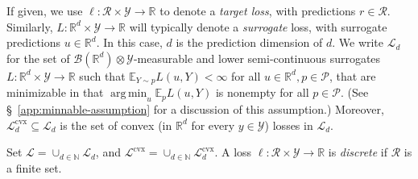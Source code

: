 \documentclass[11pt]{article} %
\newcommand{\Comments}{1}
\newcommand{\mytodo}[2]{\ifnum\Comments=1%
	\todo[linecolor=#1!80!black,backgroundcolor=#1,bordercolor=#1!80!black]{#2}\fi}
\newcommand{\btw}[1]{}%
\newcommand{\reals}{\mathbb{R}}
\newcommand{\simplex}{\Delta_\Y}
\newcommand{\A}{\mathcal{A}}
\newcommand{\E}{\mathbb{E}}
\renewcommand{\L}{\mathcal{L}}
\newcommand{\Lcvx}{\mathcal{L}^{\mathrm{cvx}}}
\newcommand{\R}{\mathcal{R}}
\renewcommand{\P}{\mathcal{P}}
\newcommand{\Y}{\mathcal{Y}}
\newcommand{\exploss}[3]{\E_{#3} #1(#2,Y)}
\DeclareMathOperator*{\argmin}{arg\,min}
\begin{document}
If given, we use $\ell: \R \times \Y \to \reals$ to denote a \emph{target loss}, with predictions $r\in\R$.
Similarly, $L: \reals^d \times \Y \to \reals$ will typically denote a \emph{surrogate} loss, with surrogate predictions $u \in \reals^d$.
In this case, $d$ is the prediction dimension of $d$.
We write $\L_d $ for the set of $\mathcal{B}(\reals^d) \otimes \Y$-measurable and lower semi-continuous surrogates $L : \reals^d \times\Y \to \reals$ such that $\E_{Y \sim p} L(u,Y) < \infty$ for all $u \in \reals^d, p \in \P$, that are minimizable in that $\argmin_{u} \exploss{L}{u}{p}$ is nonempty for all $p\in\P$.
(See \S~\ref{app:minnable-assumption} for a discussion of this assumption.)
Moreover, $\Lcvx_d \subseteq \L_d$ is the set of convex (in $\reals^d$ for every $y \in \Y$) losses in $\L_d$.
\btw{Sufficient condition for $\A$-normal convex integrand: $L$ is lower semi-continuous and $\mathcal{B}(\A) \otimes \Y$-measurable; $\E_p L(u,Y)$ finite for all $u, p$, there exists a $u_0$ for each $p$ so that $\E_p L(u_0, Y)$ is finite and continuous for Rockefellar's corollary, though it's stricter than Ioffe and Tokhimorov IIRC}
Set $\L = \cup_{d \in \mathbb{N}} \L_d$, and $\Lcvx = \cup_{d \in \mathbb{N}} \Lcvx_d$.
A loss $\ell: \R\times \Y \to \reals$ is \emph{discrete} if $\R$ is a finite set.


\end{document}
